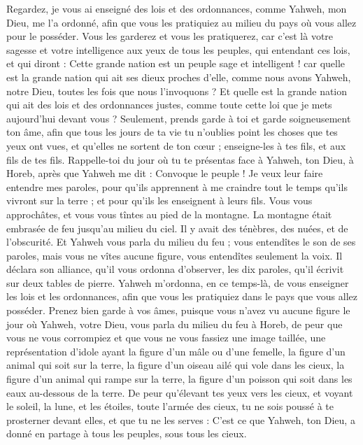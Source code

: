 \begin{multicols}{2}
Regardez, je vous ai enseigné des lois et des ordonnances, comme Yahweh, mon Dieu, me l'a ordonné, afin que vous les pratiquiez au milieu du pays où vous allez pour le posséder.
Vous les garderez et vous les pratiquerez, car c'est là votre sagesse et votre intelligence aux yeux de tous les peuples, qui entendant ces lois, et qui diront : Cette grande nation est un peuple sage et intelligent !
car quelle est la grande nation qui ait ses dieux proches d'elle, comme nous avons Yahweh, notre Dieu, toutes les fois que nous l'invoquons ?
Et quelle est la grande nation qui ait des lois et des ordonnances justes, comme toute cette loi que je mets aujourd'hui devant vous ?
Seulement, prends garde à toi et garde soigneusement ton âme, afin que tous les jours de ta vie tu n'oublies point les choses que tes yeux ont vues, et qu'elles ne sortent de ton cœur ; enseigne-les à tes fils, et aux fils de tes fils.
Rappelle-toi du jour où tu te présentas face à Yahweh, ton Dieu, à Horeb, après que Yahweh me dit : Convoque le peuple ! Je veux leur faire entendre mes paroles, pour qu'ils apprennent à me craindre tout le temps qu'ils vivront sur la terre ; et pour qu'ils les enseignent à leurs fils.
Vous vous approchâtes, et vous vous tîntes au pied de la montagne. La montagne était embrasée de feu jusqu'au milieu du ciel. Il y avait des ténèbres, des nuées, et de l'obscurité.
Et Yahweh vous parla du milieu du feu ; vous entendîtes le son de ses paroles, mais vous ne vîtes aucune figure, vous entendîtes seulement la voix.
Il déclara son alliance, qu'il vous ordonna d'observer, les dix paroles, qu'il écrivit sur deux tables de pierre.
Yahweh m'ordonna, en ce temps-là, de vous enseigner les lois et les ordonnances, afin que vous les pratiquiez dans le pays que vous allez posséder.
Prenez bien garde à vos âmes, puisque vous n'avez vu aucune figure le jour où Yahweh, votre Dieu, vous parla du milieu du feu à Horeb,
de peur que vous ne vous corrompiez et que vous ne vous fassiez une image taillée, une représentation d'idole ayant la figure d'un mâle ou d'une femelle,
la figure d'un animal qui soit sur la terre, la figure d'un oiseau ailé qui vole dans les cieux,
la figure d'un animal qui rampe sur la terre, la figure d'un poisson qui soit dans les eaux au-dessous de la terre.
De peur qu'élevant tes yeux vers les cieux, et voyant le soleil, la lune, et les étoiles, toute l'armée des cieux, tu ne sois poussé à te prosterner devant elles, et que tu ne les serves : C'est ce que Yahweh, ton Dieu, a donné en partage à tous les peuples, sous tous les cieux.

\end{multicols}
